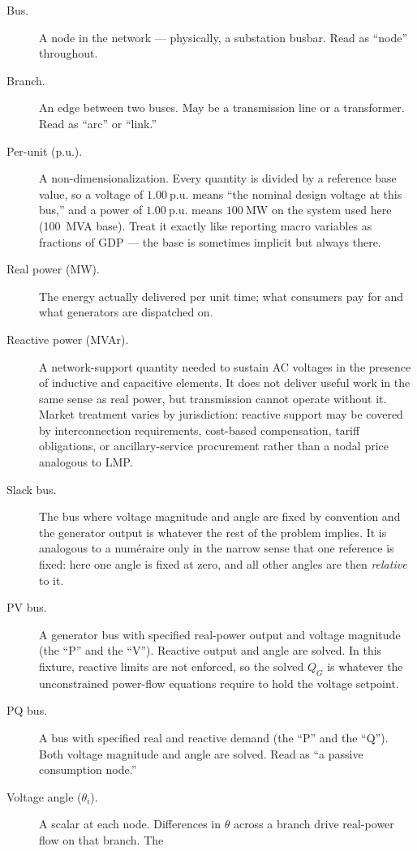 \documentclass[11pt]{article}
\newcommand{\pu}{\mathrm{p.u.}}
\newcommand{\MW}{\mathrm{MW}}
\begin{document}
\begin{description}
  \item[Bus.] A node in the network --- physically, a substation
  busbar. Read as ``node'' throughout.
  \item[Branch.] An edge between two buses. May be a transmission line or
  a transformer. Read as ``arc'' or ``link.''
  \item[Per-unit (p.u.).] A non-dimensionalization. Every quantity is
  divided by a reference base value, so a voltage of $1.00~\pu$ means
  ``the nominal design voltage at this bus,'' and a power of $1.00~\pu$
  means $100~\MW$ on the system used here (100~MVA base). Treat it
  exactly like reporting macro variables as fractions of GDP --- the
  base is sometimes implicit but always there.
  \item[Real power (MW).] The energy actually delivered per unit time;
  what consumers pay for and what generators are dispatched on.
  \item[Reactive power (MVAr).] A network-support quantity needed to
  sustain AC voltages in the presence of inductive and capacitive
  elements. It does not deliver useful work in the same sense as real
  power, but transmission cannot operate without it. Market treatment
  varies by jurisdiction: reactive support may be covered by
  interconnection requirements, cost-based compensation, tariff
  obligations, or ancillary-service procurement rather than a nodal price
  analogous to LMP.
  \item[Slack bus.] The bus where voltage magnitude and angle are fixed
  by convention and the generator output is whatever the rest of the
  problem implies. It is analogous to a numéraire only in the narrow
  sense that one reference is fixed: here one angle is fixed at zero, and
  all other angles are then \emph{relative} to it.
  \item[PV bus.] A generator bus with specified real-power output and
  voltage magnitude (the ``P'' and the ``V''). Reactive output and angle
  are solved. In this fixture, reactive limits are not enforced, so the
  solved $Q_G$ is whatever the unconstrained power-flow equations require
  to hold the voltage setpoint.
  \item[PQ bus.] A bus with specified real and reactive demand (the ``P''
  and the ``Q''). Both voltage magnitude and angle are solved. Read as
  ``a passive consumption node.''
  \item[Voltage angle ($\theta_i$).] A scalar at each node. Differences in
  $\theta$ across a branch drive real-power flow on that branch. The

\end{description}
\end{document}

